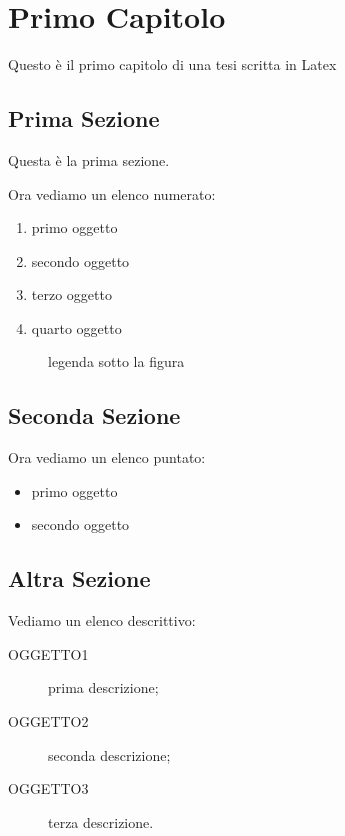 \documentclass[12pt,a4paper,openright,twoside]{report}
\begin{document}

\clearpage{\pagestyle{empty}\cleardoublepage}
\chapter{Primo Capitolo}
\lhead[\fancyplain{}{\bfseries\thepage}]{\fancyplain{}{\bfseries\rightmark}}
Questo \`e il primo capitolo di una tesi scritta in Latex ~\cite{latex}
\section{Prima Sezione}
Questa \`e la prima sezione.

Ora vediamo un elenco numerato:
\begin{enumerate}
\item primo oggetto
\item secondo oggetto
\item terzo oggetto
\item quarto oggetto
\end{enumerate}

\begin{figure}[h]
\begin{center}
\caption[legenda elenco figure]{legenda sotto la figura}\label{fig:prima}
\end{center}
\end{figure}

\section{Seconda Sezione}
Ora vediamo un elenco puntato:
\begin{itemize}
\item primo oggetto
\item secondo oggetto
\end{itemize}

\section{Altra Sezione}
Vediamo un elenco descrittivo:
\begin{description}
  \item[OGGETTO1] prima descrizione;
  \item[OGGETTO2] seconda descrizione;
  \item[OGGETTO3] terza descrizione.
\end{description}
\end{document}
